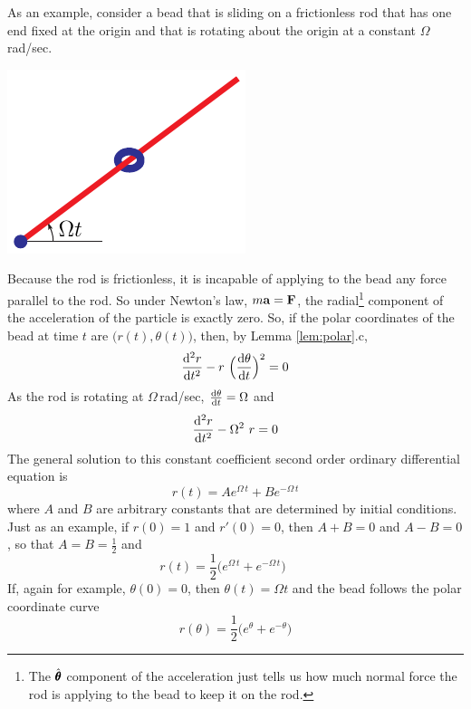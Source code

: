 \begin{eg}\label{eg:beadToss}
As an example, consider a bead that is sliding on a frictionless rod
that has one end fixed at the origin and that is rotating about the
origin at a constant $\Omega\,$rad/sec. 
\begin{efig}
\begin{center}
    \includegraphics{beadRod.pdf}
\end{center}
\end{efig}
Because the rod is frictionless, 
it is incapable of applying to the bead any force parallel to the rod. So 
under Newton's law, $m\mathbf{a}=\mathbf{F}$, the radial\footnote{The $\hat{{\pmb{\theta}}}$ component
of the acceleration just tells us how much normal force the rod is applying
to the bead to keep it on the rod.} component of the acceleration
of the particle is exactly zero. So, if the polar coordinates of the bead
at time $t$ are $\big(r(t),\theta(t)\big)$, then,
by Lemma \ref{lem:polar}.c,
\begin{equation*}
\difftwo{r}{t}-r\ \Big(\diff{\theta}{t}\Big)^2 = 0
\end{equation*}
As the rod is rotating at $\Omega\,$rad/sec,
$\diff{\theta}{t}=\Omega$ and
\begin{equation*}
\difftwo{r}{t}-\Omega^2\ r = 0
\end{equation*}
The general solution to this constant coefficient second order
ordinary differential equation is 
$$
r(t)  = A e^{\Omega\,t} + B e^{-\Omega\,t}
$$ 
where $A$ and $B$ are arbitrary constants that are determined by initial
conditions. 
Just as an example, if $r(0)= 1$ and $r'(0)= 0$,
then $A+B=0$ and $A-B=0$, so that $A=B=\frac{1}{2}$ and
\begin{equation*}
r(t)  = \frac{1}{2}\big(e^{\Omega\,t}+e^{-\Omega\,t}\big)\qquad
\end{equation*}
If, again for example, $\theta(0) = 0$, then $\theta(t) = \Omega t$
and the bead follows the polar coordinate curve
\begin{equation*}
r(\theta) = \frac{1}{2}\big(e^{\theta}+e^{-\theta}\big)

\end{equation*}
\end{eg}
